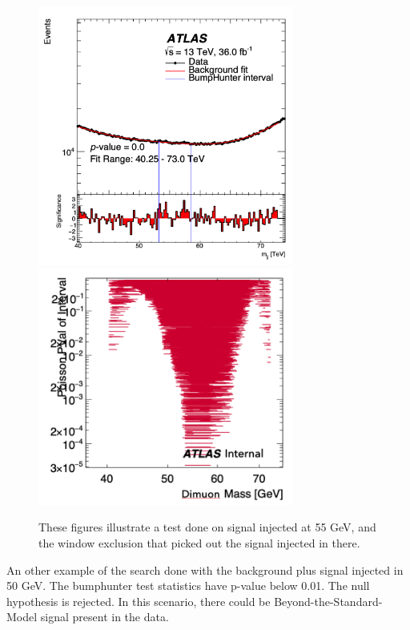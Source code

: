 \begin{itemize}
\begin{figure}[!htb]
    \begin{center}
        \includegraphics[width=0.75\textwidth]{figures/chapter_dimuon/signalinjected}
        \includegraphics[width=0.75\textwidth]{figures/chapter_dimuon/signalinjected2}
        \caption{
        These figures illustrate a test done on signal injected at 55 GeV, and the window exclusion that picked out the signal injected in there.}
    \end{center}
\end{figure}

An other example of the search done with the background plus signal injected in 50 GeV. The bumphunter test statistics have p-value below 0.01. The null hypothesis is rejected. In this scenario, there could be Beyond-the-Standard-Model signal present in the data.


\end{itemize}
